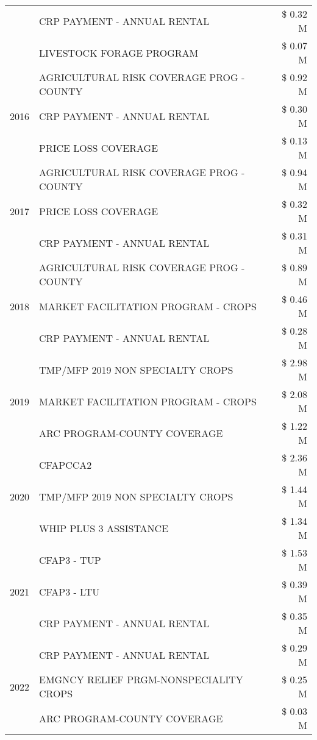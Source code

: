 \begin{tabular}{llr}
 & CRP PAYMENT - ANNUAL RENTAL & \$ 0.32 M \\
 & LIVESTOCK FORAGE PROGRAM & \$ 0.07 M \\
\cline{1-3}
\multirow[t]{3}{*}{2016} & AGRICULTURAL RISK COVERAGE PROG - COUNTY & \$ 0.92 M \\
 & CRP PAYMENT - ANNUAL RENTAL & \$ 0.30 M \\
 & PRICE LOSS COVERAGE & \$ 0.13 M \\
\cline{1-3}
\multirow[t]{3}{*}{2017} & AGRICULTURAL RISK COVERAGE PROG - COUNTY & \$ 0.94 M \\
 & PRICE LOSS COVERAGE & \$ 0.32 M \\
 & CRP PAYMENT - ANNUAL RENTAL & \$ 0.31 M \\
\cline{1-3}
\multirow[t]{3}{*}{2018} & AGRICULTURAL RISK COVERAGE PROG - COUNTY & \$ 0.89 M \\
 & MARKET FACILITATION PROGRAM - CROPS & \$ 0.46 M \\
 & CRP PAYMENT - ANNUAL RENTAL & \$ 0.28 M \\
\cline{1-3}
\multirow[t]{3}{*}{2019} & TMP/MFP 2019 NON SPECIALTY CROPS & \$ 2.98 M \\
 & MARKET FACILITATION PROGRAM - CROPS & \$ 2.08 M \\
 & ARC PROGRAM-COUNTY COVERAGE & \$ 1.22 M \\
\cline{1-3}
\multirow[t]{3}{*}{2020} & CFAPCCA2 & \$ 2.36 M \\
 & TMP/MFP 2019 NON SPECIALTY CROPS & \$ 1.44 M \\
 & WHIP PLUS 3 ASSISTANCE & \$ 1.34 M \\
\cline{1-3}
\multirow[t]{3}{*}{2021} & CFAP3 - TUP & \$ 1.53 M \\
 & CFAP3 - LTU & \$ 0.39 M \\
 & CRP PAYMENT - ANNUAL RENTAL & \$ 0.35 M \\
\cline{1-3}
\multirow[t]{3}{*}{2022} & CRP PAYMENT - ANNUAL RENTAL & \$ 0.29 M \\
 & EMGNCY RELIEF PRGM-NONSPECIALITY CROPS & \$ 0.25 M \\
 & ARC PROGRAM-COUNTY COVERAGE & \$ 0.03 M \\
\cline{1-3}
\bottomrule
\end{tabular}
